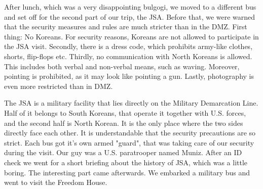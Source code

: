 \begin{post}
\begin{content}
After lunch, which was a very disappointing bulgogi, we moved to a different bus and set off for the second part of our trip, the JSA. Before that, we were warned that the security measures and rules are much stricter than in the DMZ. First thing: No Koreans. For security reasons, Koreans are not allowed to participate in the JSA visit. Secondly, there is a dress code, which prohibits army-like clothes, shorts, flip-flops etc. Thirdly, no communication with North Koreans is allowed. This includes both verbal and non-verbal means, such as waving. Moreover, pointing is prohibited, as it may look like pointing a gun. Lastly, photography is even more restricted than in DMZ.

The JSA is a military facility that lies directly on the Military Demarcation Line. Half of it belongs to South Koreans, that operate it together with U.S. forces, and the second half is North Korean. It is the only place where the two sides directly face each other. It is understandable that the security precautions are so strict. Each bus got it's own armed "guard", that was taking care of our security during the visit. Our guy was a U.S. paratrooper named Muniz. After an ID check we went for a short briefing about the history of JSA, which was a little boring. The interesting part came afterwards. We embarked a military bus and went to visit the Freedom House.

\begin{figure}
\vspace{-12pt}
\centering{}
\vspace{-26pt}
\end{figure}



\end{content}
\end{post}
